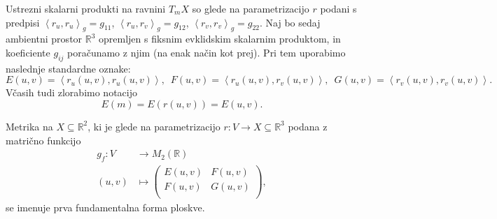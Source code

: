 Ustrezni skalarni produkti na ravnini $T_mX$ so glede na
parametrizacijo $r$ podani s predpisi $\left<r_u, r_u \right>_g  =
g_{11}$, $\left<r_u, r_v \right>_g  =
g_{12}$, $\left<r_v, r_v \right>_g  =
g_{22}$. Naj bo sedaj ambientni prostor $\mathbb{R}^3$ opremljen s
fiksnim evklidskim skalarnim produktom, in koeficiente $g_{ij}$
poračunamo z njim (na enak način kot prej). Pri tem uporabimo
naslednje standardne oznake: 
\begin{equation*} E(u,v) = \left<r_u(u,v), r_u(u,v) \right>,   \,\,\,   F(u,v) =  \left<r_u(u,v),
r_v(u,v) \right>, \,\,\,     G(u,v) =  \left<r_v(u,v), r_v(u,v)
\right>.  \end{equation*}
Včasih tudi zlorabimo notacijo 
\begin{equation*} E(m) = E(r(u,v)) = E(u,v). \end{equation*}

\begin{definicija}
\label{def_prva_fundamentalna_forma}
 Metrika na $X \subseteq  \mathbb{R}^2$, ki je glede na parametrizacijo $r: V \to  X
\subseteq  \mathbb{R}^3$ podana z matrično funkcijo \begin{align*}
 	g_f: V &\longrightarrow M_2(\mathbb{R}) \\
	(u,v) &\longmapsto 
\begin{pmatrix}
	E(u,v) & F(u,v) \\
	F(u,v) & G(u,v) \\
\end{pmatrix},
\end{align*}
se imenuje prva fundamentalna forma ploskve.
\end{definicija}

